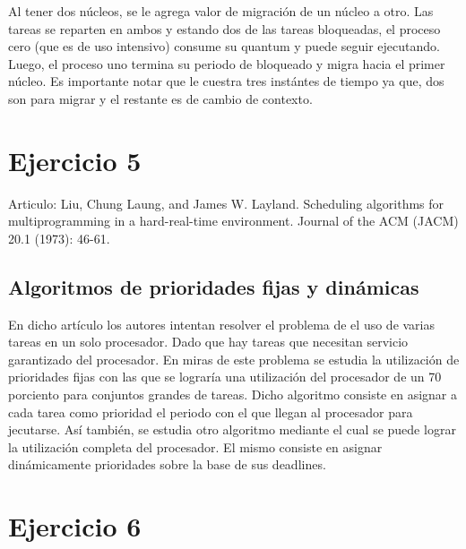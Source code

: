 \documentclass[a4paper,11pt]{article}
\begin{document}
Al tener dos n\'ucleos, se le agrega valor de migraci\'on de un n\'ucleo a otro. Las tareas se reparten en ambos y estando dos de las tareas bloqueadas, el proceso cero (que es de uso intensivo) consume su quantum y puede seguir ejecutando. Luego, el proceso uno termina su periodo de bloqueado y migra hacia el primer n\'ucleo. Es importante notar que le cuestra tres inst\'antes de tiempo ya que, dos son para migrar y el restante es de cambio de contexto. 


\section{Ejercicio 5}
Articulo: Liu, Chung Laung, and James W. Layland. Scheduling algorithms for multiprogramming
in a hard-real-time environment. Journal of the ACM (JACM) 20.1 (1973): 46-61.

\subsection{Algoritmos de prioridades fijas y din\'amicas}

En dicho art\'iculo los autores intentan resolver el problema de el uso de varias tareas en un solo procesador. Dado que hay tareas que necesitan servicio garantizado del procesador. 
En miras de este problema se estudia la utilizaci\'on de prioridades fijas con las que se lograr\'ia una utilizaci\'on del procesador de un 70 porciento para conjuntos grandes de tareas. Dicho algoritmo consiste en asignar a cada tarea como prioridad el periodo con el que llegan al procesador para jecutarse.
As\'i tambi\'en, se estudia otro algoritmo mediante el cual se puede lograr la utilizaci\'on completa del procesador. El mismo consiste en asignar dinámicamente prioridades sobre la base de sus deadlines.







\section{Ejercicio 6}
\end{document}
